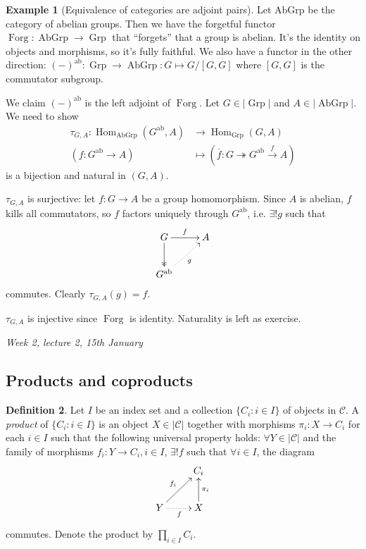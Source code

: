 \documentclass{article}
\newcommand{\Hom}{\operatorname{Hom}}
\newcommand{\Grp}{{\operatorname{Grp}}}
\newcommand{\AbGrp}{{\operatorname{AbGrp}}}
\newcommand{\ab}{{\operatorname{ab}}}
\newcommand{\ca}{\mathcal{C}}
\theoremstyle{definition}
\newtheorem{defn}{Definition}[subsection]
\newtheorem{example}[defn]{Example}
\begin{document}
\begin{example}[Equivalence of categories are adjoint pairs]
Let AbGrp be the category of abelian groups. Then we have the forgetful functor $\operatorname{Forg}:\operatorname{AbGrp}\rightarrow\operatorname{Grp}$ that ``forgets'' that a group is abelian. It's the identity on objects and morphisms, so it's fully faithful. We also have a functor in the other direction: $(-)^\ab:\operatorname{Grp}\rightarrow\operatorname{AbGrp}:G\mapsto G/[G,G]$ where $[G,G]$ is the commutator subgroup.

We claim $(-)^\ab$ is the left adjoint of $\operatorname{Forg}$. Let $G\in|\operatorname{Grp}|$ and $A\in|\operatorname{AbGrp}|$. We need to show
\[
\begin{aligned}
\tau_{G,A}:\Hom_\AbGrp(G^\ab,A)&\rightarrow\Hom_\Grp(G,A) \\
(f:G^\ab\rightarrow A) &\mapsto (\overline f:G\twoheadrightarrow G^\ab\xrightarrow{f}A)
\end{aligned}
\]
is a bijection and natural in $(G,A)$.

$\tau_{G,A}$ is surjective: let $f:G\rightarrow A$ be a group homomorphism. Since $A$ is abelian, $f$ kills all commutators, so $f$ factors uniquely through $G^\ab$, i.e. $\exists! g$ such that
\[
\xymatrix{
G\ar[r]^f\ar@{->>}[d] & A \\ G^\ab\ar@{.>}[ru]_{g}
}
\]
commutes. Clearly $\tau_{G,A}(g)=f$.

$\tau_{G,A}$ is injective since $\operatorname{Forg}$ is identity. Naturality is left as exercise.
\end{example}

\begin{flushright}
\textit{Week 2, lecture 2, 15th January}
\end{flushright}

\subsection{Products and coproducts}
\begin{defn}
Let $I$ be an index set and a collection $\{C_i:i\in I\}$ of objects in $\ca$. A \textit{product} of $\{C_i:i\in I\}$ is an object $X\in|\ca|$ together with morphisms $\pi_i:X\rightarrow C_i$ for each $i\in I$ such that the following universal property holds: $\forall Y\in|\ca|$ and the family of morphisms $f_i:Y\rightarrow C_i,i\in I$, $\exists! f$ such that $\forall i\in I$, the diagram
\[
\xymatrix{
& C_i \\
Y \ar@{.>}[r]_{f} \ar[ru]^{f_i} & X\ar[u]_{\pi_i}
}
\]
commutes. Denote the product by $\prod_{i\in I}C_i$.
\end{defn}
\end{document}
